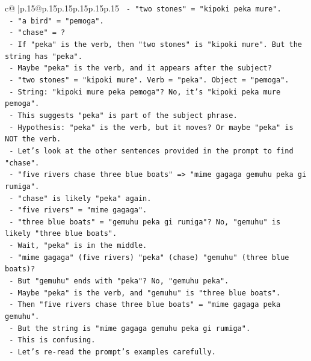 \documentclass{article}
\begin{document}
{\begin{supertabular}{c@{$\;$}|p{.15\linewidth}@{}p{.15\linewidth}p{.15\linewidth}p{.15\linewidth}p{.15\linewidth}p{.15\linewidth}}
{{{\texttt{            {-} "two stones" = "kipoki peka mure".} \\
\texttt{            {-} "a bird" = "pemoga".} \\
\texttt{            {-} "chase" = ?} \\
\texttt{            {-} If "peka" is the verb, then "two stones" is "kipoki mure". But the string has "peka".} \\
\texttt{            {-} Maybe "peka" is the verb, and it appears after the subject?} \\
\texttt{            {-} "two stones" = "kipoki mure". Verb = "peka". Object = "pemoga".} \\
\texttt{            {-} String: "kipoki mure peka pemoga"? No, it's "kipoki peka mure pemoga".} \\
\texttt{            {-} This suggests "peka" is part of the subject phrase.} \\
\texttt{            {-} Hypothesis: "peka" is the verb, but it moves? Or maybe "peka" is NOT the verb.} \\
\texttt{            {-} Let's look at the other sentences provided in the prompt to find "chase".} \\
\texttt{            {-} "five rivers chase three blue boats" => "mime gagaga gemuhu peka gi rumiga".} \\
\texttt{              {-} "chase" is likely "peka" again.} \\
\texttt{              {-} "five rivers" = "mime gagaga".} \\
\texttt{              {-} "three blue boats" = "gemuhu peka gi rumiga"? No, "gemuhu" is likely "three blue boats".} \\
\texttt{              {-} Wait, "peka" is in the middle.} \\
\texttt{              {-} "mime gagaga" (five rivers) "peka" (chase) "gemuhu" (three blue boats)?} \\
\texttt{              {-} But "gemuhu" ends with "peka"? No, "gemuhu peka".} \\
\texttt{              {-} Maybe "peka" is the verb, and "gemuhu" is "three blue boats".} \\
\texttt{              {-} Then "five rivers chase three blue boats" = "mime gagaga peka gemuhu".} \\
\texttt{              {-} But the string is "mime gagaga gemuhu peka gi rumiga".} \\
\texttt{              {-} This is confusing.} \\
\texttt{              {-} Let's re{-}read the prompt's examples carefully.} \\
}}}
\end{supertabular}}
\end{document}

